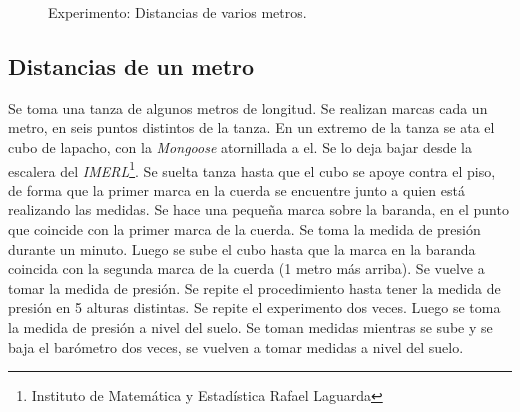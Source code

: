 \documentclass[spanish,12pt,a4paper,titlepage]{report}
\begin{document}
\vspace{-20pt}
\begin{figure}[H]
  \begin{center}
  \end{center}
\vspace{-20pt}
  \caption{Experimento: Distancias de varios metros.}
\label{fig:escalera-fing}
\end{figure}

\subsection{Distancias de un metro}

Se toma una tanza de algunos metros de longitud. Se realizan marcas cada un metro, en seis puntos distintos de la tanza. En un extremo de la tanza se ata el cubo de lapacho, con la \emph{Mongoose} atornillada a el. Se lo deja bajar desde la escalera del \emph{IMERL}\footnote{Instituto de Matemática y Estadística Rafael Laguarda}. Se suelta tanza hasta que el cubo se apoye contra el piso, de forma que la primer marca en la cuerda se encuentre junto a quien está realizando las medidas. Se hace una pequeña marca sobre la baranda, en el punto que coincide con la primer marca de la cuerda. Se toma la medida de presión durante un minuto. Luego se sube el cubo hasta que la marca en la baranda coincida con la segunda marca de la cuerda (1 metro más arriba). Se vuelve a tomar la medida de presión. Se repite el procedimiento hasta tener la medida de presión en 5 alturas distintas. 
Se repite el experimento dos veces. Luego se toma la medida de presión a nivel del suelo. Se toman medidas mientras se sube y se baja el barómetro dos veces, se vuelven a tomar medidas a nivel del suelo.
\end{document}
